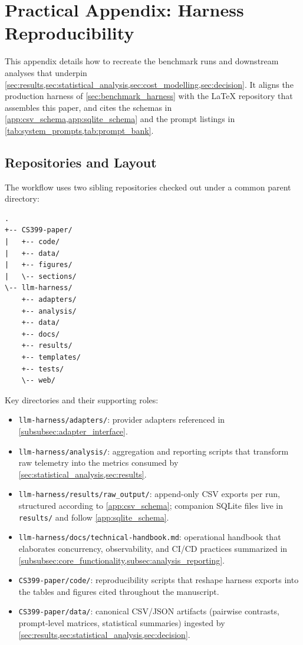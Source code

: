\section{Practical Appendix: Harness Reproducibility}
\label{sec:reproducibility_guide}

This appendix details how to recreate the benchmark runs and downstream analyses that underpin \cref{sec:results,sec:statistical_analysis,sec:cost_modelling,sec:decision}. It aligns the production harness of \cref{sec:benchmark_harness} with the LaTeX repository that assembles this paper, and cites the schemas in \cref{app:csv_schema,app:sqlite_schema} and the prompt listings in \cref{tab:system_prompts,tab:prompt_bank}.

\subsection{Repositories and Layout}
\label{subsec:repo_layout}

The workflow uses two sibling repositories checked out under a common parent directory:
\begin{verbatim}
.
+-- CS399-paper/
|   +-- code/
|   +-- data/
|   +-- figures/
|   \-- sections/
\-- llm-harness/
    +-- adapters/
    +-- analysis/
    +-- data/
    +-- docs/
    +-- results/
    +-- templates/
    +-- tests/
    \-- web/
\end{verbatim}

Key directories and their supporting roles:
\begin{itemize}
	\item \texttt{llm-harness/adapters/}: provider adapters referenced in \cref{subsubsec:adapter_interface}.
	\item \texttt{llm-harness/analysis/}: aggregation and reporting scripts that transform raw telemetry into the metrics consumed by \cref{sec:statistical_analysis,sec:results}.
	\item \texttt{llm-harness/results/raw\_output/}: append-only CSV exports per run, structured according to \cref{app:csv_schema}; companion SQLite files live in \texttt{results/} and follow \cref{app:sqlite_schema}.
	\item \texttt{llm-harness/docs/technical-handbook.md}: operational handbook that elaborates concurrency, observability, and CI/CD practices summarized in \cref{subsubsec:core_functionality,subsec:analysis_reporting}.
	\item \texttt{CS399-paper/code/}: reproducibility scripts that reshape harness exports into the tables and figures cited throughout the manuscript.
	\item \texttt{CS399-paper/data/}: canonical CSV/JSON artifacts (pairwise contrasts, prompt-level matrices, statistical summaries) ingested by \cref{sec:results,sec:statistical_analysis,sec:decision}.
\end{itemize}

